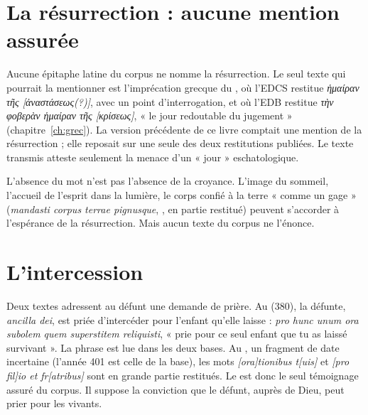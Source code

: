 \section{La résurrection : aucune mention assurée}

Aucune épitaphe latine du corpus ne nomme la résurrection. Le seul texte qui pourrait la mentionner est l’imprécation grecque du , où l’EDCS restitue \emph{ἡμαίραν τῆς [ἀναστάσεως(?)]}, avec un point d’interrogation, et où l’EDB restitue \emph{τὴν φοβερὰν ἡμαίραν τῆς [κρίσεως]}, « le jour redoutable du jugement » (chapitre~\ref{ch:grec}). La version précédente de ce livre comptait une mention de la résurrection ; elle reposait sur une seule des deux restitutions publiées. Le texte transmis atteste seulement la menace d’un « jour » eschatologique.

L’absence du mot n’est pas l’absence de la croyance. L’image du sommeil, l’accueil de l’esprit dans la lumière, le corps confié à la terre « comme un gage » (\emph{mandasti corpus terrae pignusque}, , en partie restitué) peuvent s’accorder à l’espérance de la résurrection. Mais aucun texte du corpus ne l’énonce.

\section{L’intercession}

Deux textes adressent au défunt une demande de prière. Au  (380), la défunte, \emph{ancilla dei}, est priée d’intercéder pour l’enfant qu’elle laisse : \emph{pro hunc unum ora subolem quem superstitem reliquisti}, « prie pour ce seul enfant que tu as laissé survivant ». La phrase est lue dans les deux bases. Au , un fragment de date incertaine (l’année 401 est celle de la base), les mots \emph{[ora]tionibus t[uis]} et \emph{[pro fil]io et fr[atribus]} sont en grande partie restitués. Le  est donc le seul témoignage assuré du corpus. Il suppose la conviction que le défunt, auprès de Dieu, peut prier pour les vivants.
